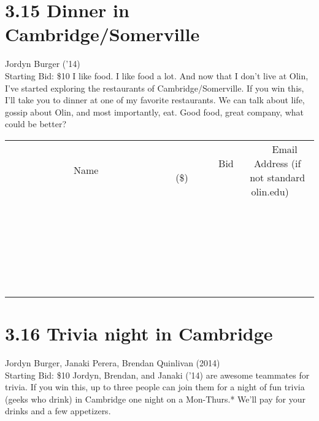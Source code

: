 \documentclass[11pt]{article}
\begin{document}
\section*{3.15 Dinner in Cambridge/Somerville}
Jordyn Burger ('14)
\\
Starting Bid: \$10
\newline
I like food. I like food a lot. And now that I don't live at Olin, I've started exploring the restaurants of Cambridge/Somerville. If you win this, I'll take you to dinner at one of my favorite restaurants. We can talk about life, gossip about Olin, and most importantly, eat. Good food, great company, what could be better?
\\[6ex]
\begin{tabular}{c c c}
~~~~~~~~~~~~~Name~~~~~~~~~~~~~ & ~~~~~~~~~Bid (\$)~~~~~~~~~  & ~~~Email Address (if not standard olin.edu)~~~\\
 & & \\
\hline
 & & \\
\hline
 & & \\
\hline
 & & \\
\hline
 & & \\
\hline
 & & \\
\hline
 & & \\
\hline
 & & \\
\hline
 & & \\
\hline
 & & \\
\hline
 & & \\
\hline
 & & \\
\hline
 & & \\
\hline
 & & \\
\hline
 & & \\
\hline
 & & \\
\hline
 & & \\
\hline
 & & \\
\hline
 & & \\
\hline
 & & \\
\hline
 & & \\
\hline
 & & \\
\hline
 & & \\
\hline
 & & \\
\hline
 & & \\
\hline
 & & \\
\hline
\end{tabular}
\newpage
\section*{3.16 Trivia night in Cambridge}
Jordyn Burger, Janaki Perera, Brendan Quinlivan (2014)
\\
Starting Bid: \$10
\newline
Jordyn, Brendan, and Janaki (’14) are awesome teammates for trivia. If you win this, up to three people can join them for a night of fun trivia (geeks who drink) in Cambridge one night on a Mon-Thurs.* We’ll pay for your drinks and a few appetizers.
 
\end{document}
